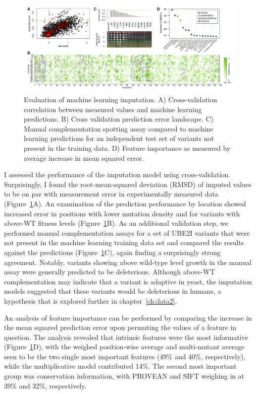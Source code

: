 \begin{landscape}
\begin{figure}[h]
	\centering
	\includegraphics[width=9in]{img/imputation.pdf}
	\caption{Evaluation of machine learning imputation. A) Cross-validation correlation between measured values and machine learning predictions. B) Cross validation prediction error landscape. C) Manual complementation spotting assay compared to machine learning predictions for an independent test set of variants not present in the training data. D) Feature importance as measured by average increase in mean squared error.}
	\label{fig:imputation}
\end{figure}
\end{landscape}

I assessed the performance of the imputation model using cross-validation. Surprisingly, I found the root-mean-squared deviation (RMSD) of imputed values to be on par with measurement error in experimentally measured data (Figure~\ref{fig:imputation}A). An examination of the prediction performance by location showed increased error in positions with lower mutation density and for variants with above-WT fitness levels (Figure~\ref{fig:imputation}B). As an additional validation step, we performed manual complementation assays for a set of UBE2I variants that were not present in the machine learning training data set and compared the results against the predictions (Figure~\ref{fig:imputation}C), again finding a surprisingly strong agreement. Notably, variants showing above wild-type level growth in the manual assay were generally predicted to be deleterious. Although above-WT complementation may indicate that a variant is adaptive in yeast, the imputation models suggested that these variants would be deleterious in humans, a hypothesis that is explored further in chapter~\ref{ch:data2}. 


An analysis of feature importance can be performed by comparing the increase in the mean squared prediction error upon permuting the values of a feature in question. The analysis revealed that intrinsic features were the most informative (Figure~\ref{fig:imputation}D), with the weighed position-wise average and multi-mutant average seen to be the two single most important features (49\% and 40\%, respectively), while the multiplicative model contributed 14\%. The second most important group was conservation information, with PROVEAN and SIFT weighing in at 39\% and 32\%, respectively.

